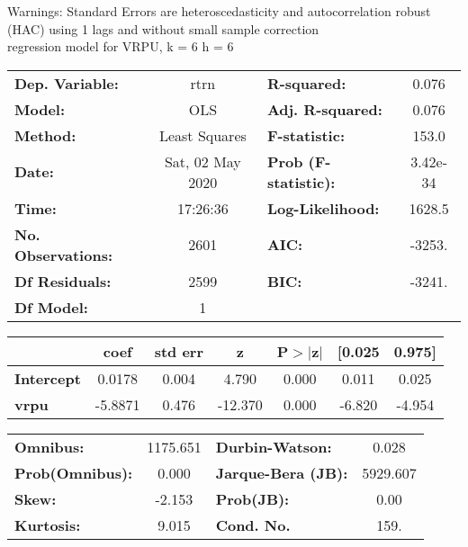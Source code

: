 Warnings: \newline
 [1] Standard Errors are heteroscedasticity and autocorrelation robust (HAC) using 1 lags and without small sample correction\\ 

regression model for VRPU, k = 6 h = 6\begin{center}
\begin{tabular}{lclc}
\toprule
\textbf{Dep. Variable:}    &       rtrn       & \textbf{  R-squared:         } &     0.076   \\
\textbf{Model:}            &       OLS        & \textbf{  Adj. R-squared:    } &     0.076   \\
\textbf{Method:}           &  Least Squares   & \textbf{  F-statistic:       } &     153.0   \\
\textbf{Date:}             & Sat, 02 May 2020 & \textbf{  Prob (F-statistic):} &  3.42e-34   \\
\textbf{Time:}             &     17:26:36     & \textbf{  Log-Likelihood:    } &    1628.5   \\
\textbf{No. Observations:} &        2601      & \textbf{  AIC:               } &    -3253.   \\
\textbf{Df Residuals:}     &        2599      & \textbf{  BIC:               } &    -3241.   \\
\textbf{Df Model:}         &           1      & \textbf{                     } &             \\
\bottomrule
\end{tabular}
\begin{tabular}{lcccccc}
                   & \textbf{coef} & \textbf{std err} & \textbf{z} & \textbf{P$> |$z$|$} & \textbf{[0.025} & \textbf{0.975]}  \\
\midrule
\textbf{Intercept} &       0.0178  &        0.004     &     4.790  &         0.000        &        0.011    &        0.025     \\
\textbf{vrpu}      &      -5.8871  &        0.476     &   -12.370  &         0.000        &       -6.820    &       -4.954     \\
\bottomrule
\end{tabular}
\begin{tabular}{lclc}
\textbf{Omnibus:}       & 1175.651 & \textbf{  Durbin-Watson:     } &    0.028  \\
\textbf{Prob(Omnibus):} &   0.000  & \textbf{  Jarque-Bera (JB):  } & 5929.607  \\
\textbf{Skew:}          &  -2.153  & \textbf{  Prob(JB):          } &     0.00  \\
\textbf{Kurtosis:}      &   9.015  & \textbf{  Cond. No.          } &     159.  \\
\bottomrule
\end{tabular}
\end{center}

